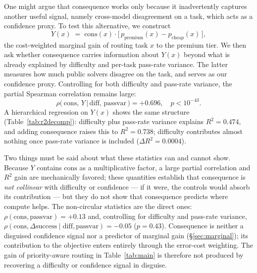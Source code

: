 \documentclass{article}
\begin{document}
One might argue that consequence works only because it
inadvertently captures another useful signal, namely cross-model disagreement on a task, which acts as a confidence proxy. To test this alternative, we construct
\[
Y(x) \;=\; \mathrm{cons}(x)\cdot
\bigl[\,p_{\mathrm{premium}}(x) - p_{\mathrm{cheap}}(x)\,\bigr],
\]
the cost-weighted marginal gain of routing task $x$ to the premium
tier. We then ask whether consequence carries information about
$Y(x)$ beyond what is already explained by difficulty and per-task
pass-rate variance. The latter measures how much public solvers
disagree on the task, and serves as our confidence proxy. Controlling
for both difficulty and pass-rate variance, the partial Spearman
correlation remains large:
\[
\rho\bigl(\,\mathrm{cons},\, Y \,\big|\, \mathrm{diff},\,
\mathrm{passvar}\,\bigr) = +0.696,\quad p < 10^{-43}.
\]
A hierarchical regression on $Y(x)$ shows the same structure
(Table~\ref{tab:r2decomp}): difficulty plus pass-rate variance
explains $R^2 = 0.474$, and adding consequence raises this to
$R^2 = 0.738$; difficulty contributes almost nothing once pass-rate
variance is included ($\Delta R^2 = 0.0004$).

Two things must be said about what these statistics can and cannot
show. Because $Y$ contains $\mathrm{cons}$ as a multiplicative
factor, a large partial correlation and $R^2$ gain are mechanically
favored; these quantities establish that consequence is \emph{not
collinear} with difficulty or confidence --- if it were, the controls
would absorb its contribution --- but they do not show that
consequence predicts where compute helps. The non-circular statistics
are the direct ones: $\rho(\mathrm{cons}, \mathrm{passvar}) = +0.13$
and, controlling for difficulty and pass-rate variance,
$\rho(\mathrm{cons}, \Delta\mathrm{success} \mid \mathrm{diff},
\mathrm{passvar}) = -0.05$ ($p = 0.43$). Consequence is neither a
disguised confidence signal nor a predictor of marginal gain
(\S\ref{sec:marginal}); its contribution to the objective enters
entirely through the error-cost weighting. The gain of
priority-aware routing in Table~\ref{tab:main} is therefore not
produced by recovering a difficulty or confidence signal in
disguise.
\end{document}
